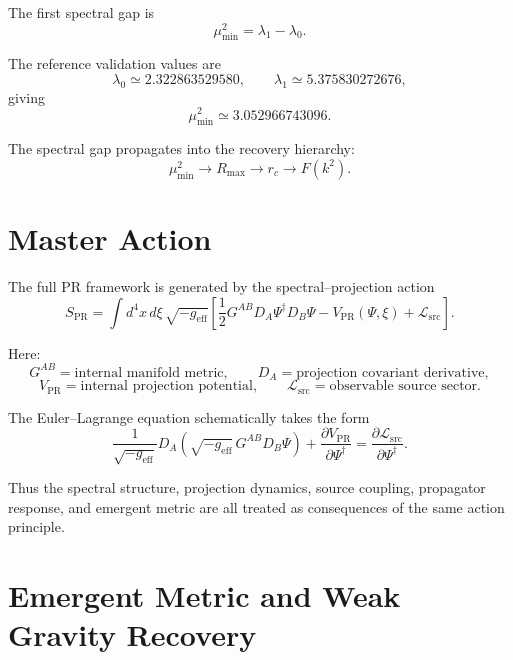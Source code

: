 \documentclass[11pt]{article}
\newcommand{\PR}{\mathrm{PR}}
\newcommand{\eff}{\mathrm{eff}}
\newcommand{\src}{\mathrm{src}}
\begin{document}
The first spectral gap is
\begin{equation}
\boxed{
\mu_{\min}^2=\lambda_1-\lambda_0.
}
\end{equation}

The reference validation values are
\begin{equation}
\lambda_0\simeq2.322863529580,
\qquad
\lambda_1\simeq5.375830272676,
\end{equation}
giving
\begin{equation}
\mu_{\min}^2\simeq3.052966743096.
\end{equation}

The spectral gap propagates into the recovery hierarchy:
\begin{equation}
\boxed{
\mu_{\min}^2
\rightarrow
R_{\max}
\rightarrow
r_c
\rightarrow
F(k^2).
}
\end{equation}


\section{Master Action}

The full PR framework is generated by the spectral--projection action
\begin{equation}
\boxed{
S_{\PR}
=
\int d^4x\,d\xi\,
\sqrt{-g_{\eff}}
\left[
\frac12G^{AB}D_A\Psi^\dagger D_B\Psi
-
V_{\PR}(\Psi,\xi)
+
\mathcal L_{\src}
\right].
}
\end{equation}

Here:
\[
G^{AB}=\text{internal manifold metric},\qquad
D_A=\text{projection covariant derivative},
\]
\[
V_{\PR}=\text{internal projection potential},\qquad
\mathcal L_{\src}=\text{observable source sector}.
\]

The Euler--Lagrange equation schematically takes the form
\begin{equation}
\frac{1}{\sqrt{-g_{\eff}}}
D_A
\left(
\sqrt{-g_{\eff}}\,G^{AB}D_B\Psi
\right)
+
\frac{\partial V_{\PR}}{\partial\Psi^\dagger}
=
\frac{\partial\mathcal L_{\src}}{\partial\Psi^\dagger}.
\end{equation}

Thus the spectral structure, projection dynamics, source coupling, propagator response, and emergent metric are all treated as consequences of the same action principle.


\section{Emergent Metric and Weak Gravity Recovery}
\end{document}
